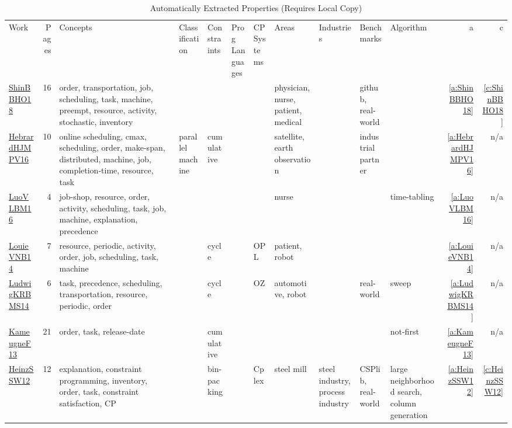 {\scriptsize
\begin{longtable}{>{\raggedright\arraybackslash}p{3cm}r>{\raggedright\arraybackslash}p{4cm}p{1.5cm}p{2cm}p{1.5cm}p{1.5cm}p{1.5cm}p{1.5cm}p{2cm}p{1.5cm}rr}
\rowcolor{white}\caption{Automatically Extracted  Properties (Requires Local Copy)}\\ \toprule
\rowcolor{white}Work & Pages & Concepts & Classification & Constraints & \shortstack{Prog\\Languages} & \shortstack{CP\\Systems} & Areas & Industries & Benchmarks & Algorithm & a & c\\ \midrule\endhead
\bottomrule
\endfoot
\href{../works/ShinBBHO18.pdf}{ShinBBHO18}~\cite{ShinBBHO18} & 16 & order, transportation, job, scheduling, task, machine, preempt, resource, activity, stochastic, inventory &  &  &  &  & physician, nurse, patient, medical &  & github, real-world &  & \ref{a:ShinBBHO18} & \ref{c:ShinBBHO18}\\
\href{../works/HebrardHJMPV16.pdf}{HebrardHJMPV16}~\cite{HebrardHJMPV16} & 10 & online scheduling, cmax, scheduling, order, make-span, distributed, machine, job, completion-time, resource, task & parallel machine & cumulative &  &  & satellite, earth observation &  & industrial partner &  & \ref{a:HebrardHJMPV16} & n/a\\
\href{../works/LuoVLBM16.pdf}{LuoVLBM16}~\cite{LuoVLBM16} & 4 & job-shop, resource, order, activity, scheduling, task, job, machine, explanation, precedence &  &  &  &  & nurse &  &  & time-tabling & \ref{a:LuoVLBM16} & n/a\\
\href{../works/LouieVNB14.pdf}{LouieVNB14}~\cite{LouieVNB14} & 7 & resource, periodic, activity, order, job, scheduling, task, machine &  & cycle &  & OPL & patient, robot &  &  &  & \ref{a:LouieVNB14} & n/a\\
\href{../works/LudwigKRBMS14.pdf}{LudwigKRBMS14}~\cite{LudwigKRBMS14} & 6 & task, precedence, scheduling, transportation, resource, periodic, order &  & cycle &  & OZ & automotive, robot &  & real-world & sweep & \ref{a:LudwigKRBMS14} & n/a\\
\href{../works/KameugneF13.pdf}{KameugneF13}~\cite{KameugneF13} & 21 & order, task, release-date &  & cumulative &  &  &  &  &  & not-first & \ref{a:KameugneF13} & n/a\\
\href{../works/HeinzSSW12.pdf}{HeinzSSW12}~\cite{HeinzSSW12} & 12 & explanation, constraint programming, inventory, order, task, constraint satisfaction, CP &  & bin-packing &  & Cplex & steel mill & steel industry, process industry & CSPlib, real-world & large neighborhood search, column generation & \ref{a:HeinzSSW12} & \ref{c:HeinzSSW12}\\

\end{longtable}}
